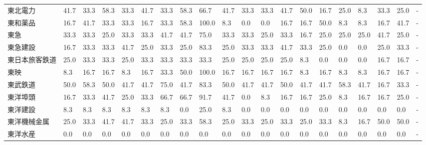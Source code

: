 \documentclass[a4paper，11pt]{jsarticle}
\begin{document}
\begin{longtable}[c]{lp{3mm}p{3mm}p{3mm}p{3mm}p{3mm}p{3mm}p{3mm}p{3mm}p{3mm}p{3mm}p{3mm}p{3mm}p{3mm}p{3mm}p{3mm}p{3mm}p{3mm}p{3mm}p{3mm}}
東北電力            &   41.7 &   33.3 &      58.3 &      33.3 &       41.7 &   33.3 &   58.3 &   66.7 &    41.7 &    33.3 &   33.3 &  41.7 &   50.0 &    16.7 &    25.0 &   8.3 &  33.3 &  25.0 &     - \\
東和薬品            &   16.7 &   41.7 &      33.3 &      33.3 &       16.7 &   33.3 &   58.3 &  100.0 &     8.3 &     0.0 &    0.0 &  16.7 &   16.7 &    50.0 &     8.3 &   8.3 &  16.7 &  41.7 &     - \\
東急              &   33.3 &   33.3 &      25.0 &      33.3 &       33.3 &   41.7 &   41.7 &   75.0 &    33.3 &    33.3 &   25.0 &  33.3 &   16.7 &    25.0 &    25.0 &  25.0 &  41.7 &  25.0 &     - \\
東急建設            &   16.7 &   33.3 &      33.3 &      41.7 &       25.0 &   33.3 &   25.0 &   83.3 &    25.0 &    33.3 &   33.3 &  41.7 &   33.3 &    25.0 &     0.0 &   0.0 &  25.0 &  33.3 &     - \\
東日本旅客鉄道         &   25.0 &   33.3 &      33.3 &      25.0 &       33.3 &   33.3 &   33.3 &   33.3 &    25.0 &    25.0 &   25.0 &  25.0 &    8.3 &     0.0 &     0.0 &   0.0 &  16.7 &  16.7 &     - \\
東映              &    8.3 &   16.7 &      16.7 &       8.3 &       16.7 &   33.3 &   50.0 &  100.0 &    16.7 &    16.7 &   16.7 &  16.7 &    8.3 &    16.7 &     8.3 &   8.3 &  16.7 &  16.7 &     - \\
東武鉄道            &   50.0 &   58.3 &      50.0 &      41.7 &       41.7 &   75.0 &   41.7 &   83.3 &    50.0 &    41.7 &   41.7 &  50.0 &   41.7 &    41.7 &    58.3 &  41.7 &  16.7 &  33.3 &     - \\
東洋埠頭            &   16.7 &   33.3 &      41.7 &      25.0 &       33.3 &   66.7 &   66.7 &   91.7 &    41.7 &     0.0 &    8.3 &  16.7 &   16.7 &    25.0 &     8.3 &  16.7 &  16.7 &  25.0 &     - \\
東洋建設            &    8.3 &    8.3 &       8.3 &       8.3 &        8.3 &    8.3 &    0.0 &   25.0 &     8.3 &     0.0 &    0.0 &   0.0 &    0.0 &     0.0 &     0.0 &   0.0 &   0.0 &   0.0 &     - \\
東洋機械金属          &   25.0 &   33.3 &      41.7 &      41.7 &       33.3 &   25.0 &   33.3 &   58.3 &    25.0 &    33.3 &   25.0 &  33.3 &   25.0 &    33.3 &     8.3 &  16.7 &  50.0 &  50.0 &     - \\
東洋水産            &    0.0 &    0.0 &       0.0 &       0.0 &        0.0 &    0.0 &    0.0 &    0.0 &     0.0 &     0.0 &    0.0 &   0.0 &    0.0 &     0.0 &     0.0 &   0.0 &   0.0 &   0.0 &     - \\

\end{longtable}
\end{document}
